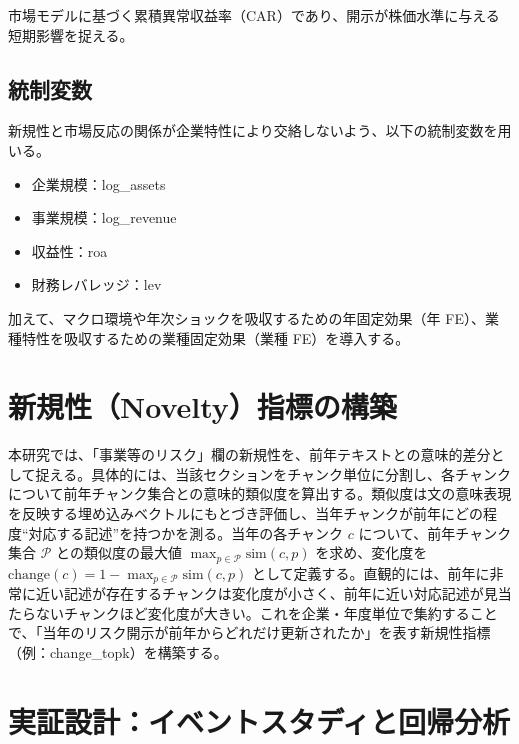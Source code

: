 市場モデルに基づく累積異常収益率（CAR）であり、開示が株価水準に与える短期影響を捉える。

\subsection{統制変数}

新規性と市場反応の関係が企業特性により交絡しないよう、以下の統制変数を用いる。

\begin{itemize}

  \item 企業規模：log\_assets

  \item 事業規模：log\_revenue

  \item 収益性：roa

  \item 財務レバレッジ：lev

\end{itemize}

加えて、マクロ環境や年次ショックを吸収するための年固定効果（年 FE）、業種特性を吸収するための業種固定効果（業種 FE）を導入する。

\section{新規性（Novelty）指標の構築}

本研究では、「事業等のリスク」欄の新規性を、前年テキストとの意味的差分として捉える。具体的には、当該セクションをチャンク単位に分割し、各チャンクについて前年チャンク集合との意味的類似度を算出する。類似度は文の意味表現を反映する埋め込みベクトルにもとづき評価し、当年チャンクが前年にどの程度“対応する記述”を持つかを測る。当年の各チャンク \(c\) について、前年チャンク集合 \(\mathcal{P}\) との類似度の最大値 \(\max_{p\in\mathcal{P}}\mathrm{sim}(c,p)\) を求め、変化度を \(\mathrm{change}(c)=1-\max_{p\in\mathcal{P}}\mathrm{sim}(c,p)\) として定義する。直観的には、前年に非常に近い記述が存在するチャンクは変化度が小さく、前年に近い対応記述が見当たらないチャンクほど変化度が大きい。これを企業・年度単位で集約することで、「当年のリスク開示が前年からどれだけ更新されたか」を表す新規性指標（例：change\_topk）を構築する。

\section{実証設計：イベントスタディと回帰分析}


